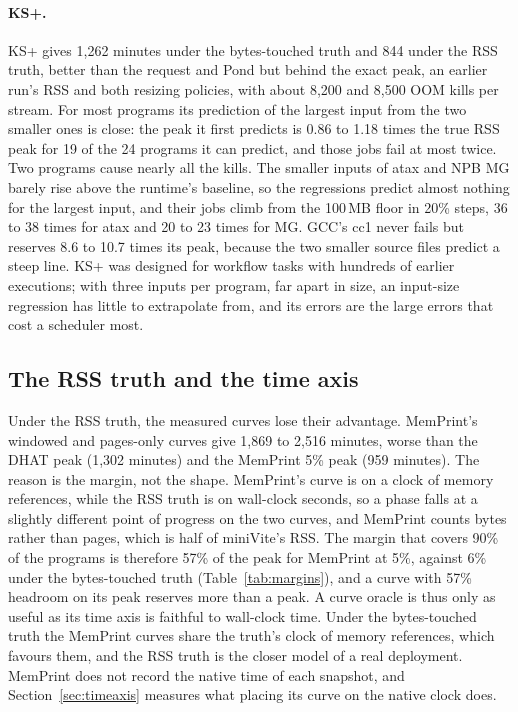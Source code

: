 \documentclass[11pt]{article}
\newcommand{\memprint}{MemPrint}
\newcommand{\secref}[1]{Section~\ref{#1}}
\newcommand{\tabref}[1]{Table~\ref{#1}}
\begin{document}
\paragraph{KS+.} KS+ gives 1{,}262 minutes under the bytes-touched truth and 844 under the RSS truth, better than
the request and Pond but behind the exact peak, an earlier run's RSS and both resizing policies, with about 8{,}200
and 8{,}500 OOM kills per stream. For most programs its prediction of the largest input from the two smaller
ones is close: the peak it first predicts is 0.86 to 1.18 times the true RSS peak for 19 of the 24 programs it
can predict, and those jobs fail at most twice. Two programs cause nearly all the kills. The smaller inputs of
atax and NPB MG barely rise above the runtime's baseline, so the regressions predict almost nothing for the
largest input, and their jobs climb from the 100\,MB floor in 20\% steps, 36 to 38 times for atax and 20 to 23
times for MG. GCC's cc1 never fails but reserves 8.6 to 10.7 times its peak, because the two smaller source files
predict a steep line. KS+ was designed for workflow tasks with hundreds of earlier executions; with three inputs
per program, far apart in size, an input-size regression has little to extrapolate from, and its errors are
the large errors that cost a scheduler most.

\begin{table}[t]
\centering
\caption{The margin each oracle needs to stay above the truth, as a share of its own peak (\%), over the 25
programs at their largest inputs.}
\label{tab:margins}

\end{table}

\subsection{The RSS truth and the time axis}
\label{sec:rsstruth}

Under the RSS truth, the measured curves lose their advantage. \memprint{}'s windowed and pages-only curves give
1{,}869 to 2{,}516 minutes, worse than the DHAT peak (1{,}302 minutes) and the \memprint{} 5\% peak (959 minutes). The
reason is the margin, not the shape. \memprint{}'s curve is on a clock of memory references, while the RSS truth
is on wall-clock seconds, so a phase falls at a slightly different point of progress on the two curves, and
\memprint{} counts bytes rather than pages, which is half of miniVite's RSS. The margin that covers 90\% of the
programs is therefore 57\% of the peak for \memprint{} at 5\%, against 6\% under the bytes-touched truth
(\tabref{tab:margins}), and a curve with 57\% headroom on its peak reserves more than a peak. A curve oracle is thus only as useful as its time
axis is faithful to wall-clock time. Under the bytes-touched truth the \memprint{} curves share the truth's clock
of memory references, which favours them, and the RSS truth is the closer model of a real deployment. \memprint{} does not record
the native time of each snapshot, and \secref{sec:timeaxis} measures what placing its curve on the native clock
does.
\end{document}
